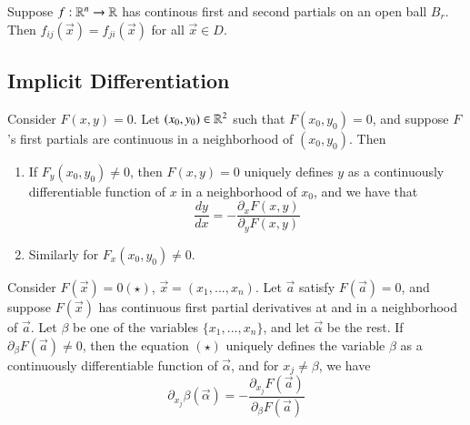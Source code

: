 \begin{appendices}
    \begin{thm}
        Suppose $f:\mathbb R^n\rightarrow \mathbb R$ has continous first and second partials on an open ball $B_r$. Then $f_{ij}(\vec{x}) = f_{ji}(\vec{x})$ for all $\vec{x} \in D$.
    \end{thm}


    \subsection{Implicit Differentiation}

    \begin{thm}
        Consider $F(x,y) = 0$. Let $(x_0,y_0) \in \mathbb R^2$ such that $F(x_0,y_0) = 0$, and suppose $F$'s first partials are continuous in a neighborhood of $(x_0,y_0)$. Then \begin{enumerate}
            \item If $F_y(x_0,y_0) \neq 0$, then $F(x,y) = 0$ uniquely defines $y$ as a continuously differentiable function of $x$ in a neighborhood of $x_0$, and we have that \begin{equation}
                    \frac{dy}{dx} = -\frac{\partial_x F(x,y)}{\partial_y F(x,y)}
                \end{equation}
            \item Similarly for $F_x(x_0,y_0) \neq 0$.
        \end{enumerate}
    \end{thm}


    \begin{thm}
        Consider $F(\vec{x}) = 0 (\star)$, $\vec{x} = (x_1,...,x_n)$. Let $\vec{a}$ satisfy $F(\vec{a}) = 0$, and suppose $F(\vec{x})$ has continuous first partial derivatives at and in a neighborhood of $\vec{a}$. Let $\beta$ be one of the variables $\{x_1,...,x_n\}$, and let $\vec{\alpha}$ be the rest. If $\partial_{\beta}F(\vec{a}) \neq 0$, then the equation $(\star)$ uniquely defines the variable $\beta$ as a continuously differentiable function of $\vec{\alpha}$, and for $x_j \neq \beta$, we have \begin{equation}
            \partial_{x_j}\beta(\vec{\alpha}) = -\frac{\partial_{x_j}F(\vec{a})}{\partial_{\beta}F(\vec{a})}
        \end{equation}
    \end{thm}



\end{appendices}
